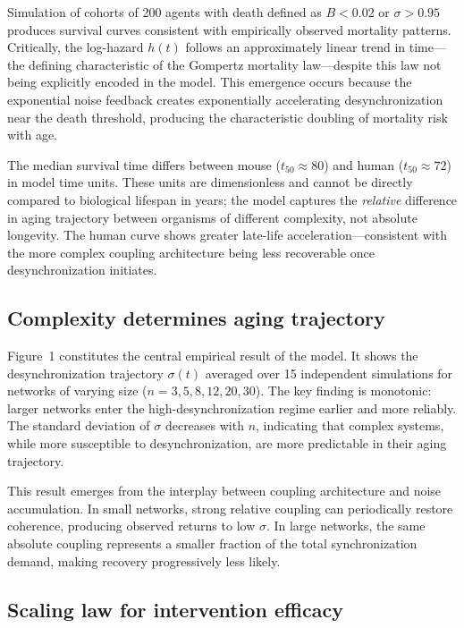 \documentclass[12pt]{article}
\begin{document}
Simulation of cohorts of 200 agents with death defined as $B < 0.02$ or $\sigma
> 0.95$ produces survival curves consistent with empirically observed mortality
patterns. Critically, the log-hazard $h(t)$ follows an approximately linear
trend in time---the defining characteristic of the Gompertz mortality
law---despite this law not being explicitly encoded in the model. This emergence
occurs because the exponential noise feedback creates exponentially accelerating
desynchronization near the death threshold, producing the characteristic doubling
of mortality risk with age.

The median survival time differs between mouse ($t_{50} \approx 80$) and human
($t_{50} \approx 72$) in model time units. These units are dimensionless and
cannot be directly compared to biological lifespan in years; the model captures
the \emph{relative} difference in aging trajectory between organisms of different
complexity, not absolute longevity. The human curve shows greater
late-life acceleration---consistent with the more complex coupling architecture
being less recoverable once desynchronization initiates.

\subsection{Complexity determines aging trajectory}

Figure~1 constitutes the central empirical result of the model. It shows the
desynchronization trajectory $\sigma(t)$ averaged over 15 independent
simulations for networks of varying size ($n = 3, 5, 8, 12, 20, 30$). The key
finding is monotonic: larger networks enter the high-desynchronization regime
earlier and more reliably. The standard deviation of $\sigma$ decreases with
$n$, indicating that complex systems, while more susceptible to
desynchronization, are more predictable in their aging trajectory.

This result emerges from the interplay between coupling architecture and noise
accumulation. In small networks, strong relative coupling can periodically
restore coherence, producing observed returns to low $\sigma$. In large networks,
the same absolute coupling represents a smaller fraction of the total
synchronization demand, making recovery progressively less likely.

\subsection{Scaling law for intervention efficacy}
\end{document}
